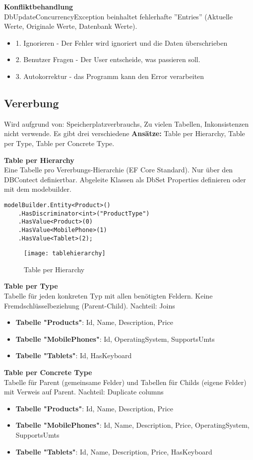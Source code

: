 \textbf{Konfliktbehandlung} \\
DbUpdateConcurrencyException beinhaltet fehlerhafte ”Entries” (Aktuelle Werte, Originale Werte, Datenbank Werte).

\begin{itemize}
	\item 1. Ignorieren - Der Fehler wird ignoriert und die Daten überschrieben
	\item 2. Benutzer Fragen - Der User entscheide, was passieren soll.
	\item 3. Autokorrektur - das Programm kann den Error verarbeiten
\end{itemize}

\subsection{Vererbung}
Wird aufgrund von: Speicherplatzverbrauchs, Zu vielen Tabellen, Inkonsistenzen nicht verwende. Es gibt drei verschiedene \textbf{Ansätze:} Table per Hierarchy, Table per Type, Table per Concrete Type. 

\textbf{Table per Hierarchy} \\
Eine Tabelle pro Vererbungs-Hierarchie (EF Core Standard). Nur über den DBContect definiertbar. Abgeleite Klassen als DbSet Properties definieren oder mit dem modebuilder.
\begin{lstlisting}
modelBuilder.Entity<Product>()
	.HasDiscriminator<int>("ProductType") 
	.HasValue<Product>(0) 
	.HasValue<MobilePhone>(1) 
	.HasValue<Tablet>(2);
\end{lstlisting}

\begin{figure}[h!]
  \center
  \texttt{[image: tablehierarchy]}
  \caption{Table per Hierarchy}
\end{figure}

\textbf{Table per Type} \\
Tabelle für jeden konkreten Typ mit allen benötigten Feldern. Keine Fremdschlüsselbeziehung (Parent-Child). Nachteil: Joins
\begin{itemize}
    \item \textbf{Tabelle "Products"}: Id, Name, Description, Price
    \item \textbf{Tabelle "MobilePhones"}: Id, OperatingSystem, SupportsUmts
    \item \textbf{Tabelle "Tablets"}: Id, HasKeyboard
\end{itemize}

\textbf{Table per Concrete Type} \\
Tabelle für Parent (gemeinsame Felder) und Tabellen für Childs (eigene Felder) mit Verweis auf Parent. Nachteil: Duplicate columns
\begin{itemize}
    \item \textbf{Tabelle "Products"}: Id, Name, Description, Price
    \item \textbf{Tabelle "MobilePhones"}: Id, Name, Description, Price, OperatingSystem, SupportsUmts
    \item \textbf{Tabelle "Tablets"}: Id, Name, Description, Price, HasKeyboard
\end{itemize}

